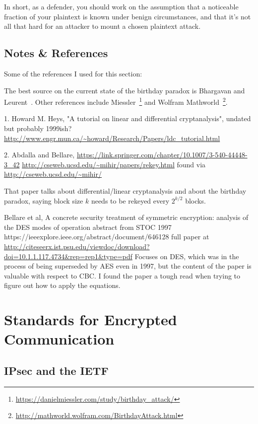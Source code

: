 \documentclass[%
 aip,
 jmp,%
 amsmath,amssymb,
 reprint,%
]{revtex4-1}
\begin{document}
In short, as a defender, you should work on the assumption that a
noticeable fraction of your plaintext is known under benign
circumstances, and that it's not all that hard for an attacker to
mount a chosen plaintext attack.

\subsection{Notes \& References}

Some of the references I used for this section:

The best source on the current state of the birthday paradox is Bhargavan and Leurent~\cite{bhargavan2016practical}.  Other references include Miessler~\footnote{\url{https://danielmiessler.com/study/birthday_attack/}} and Wolfram Mathworld~\footnote{\url{http://mathworld.wolfram.com/BirthdayAttack.html}}.

1. Howard M. Heys, "A tutorial on linear and differential
cryptanalysis", undated but probably 1999ish?
\url{http://www.engr.mun.ca/~howard/Research/Papers/ldc_tutorial.html}

2. Abdalla and Bellare,
\url{https://link.springer.com/chapter/10.1007/3-540-44448-3_42}
\url{http://cseweb.ucsd.edu/~mihir/papers/rekey.html}
found via
\url{http://cseweb.ucsd.edu/~mihir/}

That paper talks about differential/linear cryptanalysis and about the
birthday paradox, saying block size $k$ needs to be rekeyed every
$2^{k/2}$ blocks.

Bellare et al, A concrete security treatment of symmetric encryption:
analysis of the DES modes of operation
abstract from STOC 1997
https://ieeexplore.ieee.org/abstract/document/646128
full paper at
\url{http://citeseerx.ist.psu.edu/viewdoc/download?doi=10.1.1.117.4734&rep=rep1&type=pdf}
Focuses on DES, which was in the process of being superseded by AES
even in 1997, but the content of the paper is valuable with respect to
CBC.  I found the paper a tough read when trying to figure out how to
apply the equations.

\section{Standards for Encrypted Communication}

\subsection{IPsec and the IETF}
\label{sec:ipsec}
\end{document}
